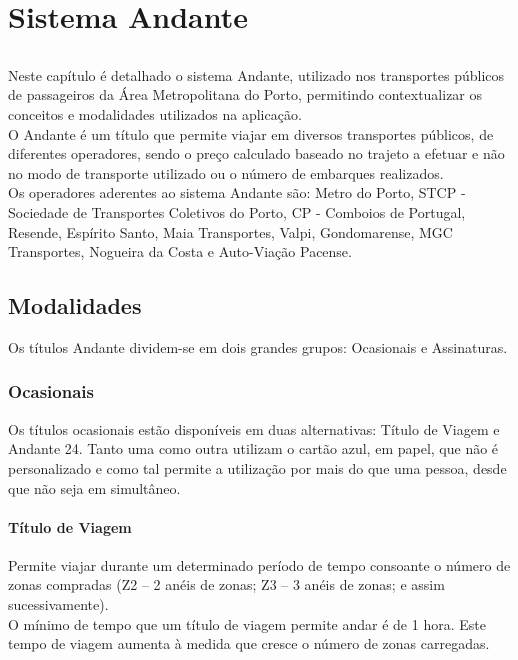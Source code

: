 \chapter{Sistema Andante}\label{chap:andante}

\section*{}

Neste capítulo é detalhado o sistema Andante, utilizado nos transportes públicos de passageiros da Área Metropolitana do Porto, permitindo contextualizar os conceitos e modalidades utilizados na aplicação.
\\O Andante é um título que permite viajar em diversos transportes públicos, de diferentes operadores, sendo o preço calculado baseado no trajeto a efetuar e não no modo de transporte utilizado ou o número de embarques realizados.
\\Os operadores aderentes ao sistema Andante são: Metro do Porto, STCP - Sociedade de Transportes Coletivos do Porto, CP - Comboios de Portugal, Resende, Espírito Santo, Maia Transportes, Valpi, Gondomarense, MGC Transportes, Nogueira da Costa e Auto-Viação Pacense. 

\section{Modalidades}

Os títulos Andante dividem-se em dois grandes grupos: Ocasionais e Assinaturas.

\subsection{Ocasionais}

Os títulos ocasionais estão disponíveis em duas alternativas: Título de Viagem e Andante 24. Tanto uma como outra utilizam o cartão azul, em papel, que não é personalizado e como tal permite a utilização por mais do que uma pessoa, desde que não seja em simultâneo.

\subsubsection{Título de Viagem}

Permite viajar durante um determinado período de tempo consoante o número de zonas compradas (Z2 – 2 anéis de zonas; Z3 – 3 anéis de zonas; e assim sucessivamente).
\\O mínimo de tempo que um título de viagem permite andar é de 1 hora. Este tempo de viagem aumenta à medida que cresce o número de zonas carregadas.

